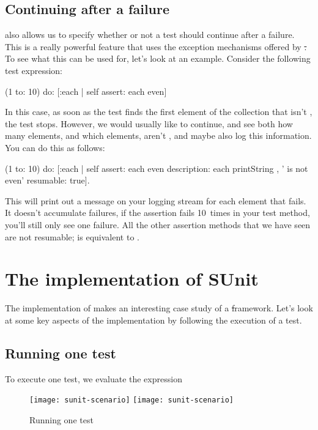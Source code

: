 \documentclass[a4paper,10pt,twoside]{book}
\begin{document}
\subsection{Continuing after a failure}
\sunit also allows us to specify whether or not a test should continue after a failure.
This is a really powerful feature that uses the exception mechanisms offered by \st.
To see what this can be used for, let's look at an example.
Consider the following test expression:
\begin{code}{}
(1 to: 10) do: [:each | self assert: each even]
\end{code}
In this case, as soon as the test finds the first element of the collection that isn't , the test stops.
However, we would usually like to continue, and see both how many elements, and which elements, aren't , and maybe also log this information.
You can do this as follows:
\begin{code}{}
(1 to: 10) do: [:each |
	self
		assert: each even
		description: each printString , ' is not even'
		resumable: true].
\end{code}
This will print out a message on your logging stream for each element that fails.
It doesn't accumulate failures, \ie if the assertion fails 10~times in your test method, you'll still only see one failure.
All the other assertion methods that we have seen are not resumable;  is equivalent to .
\section{The implementation of SUnit}

The implementation of \sunit makes an interesting case study of a \st framework.
Let's look at some key aspects of the implementation by following the execution of a test.
\subsection{Running one test}

To execute one test, we evaluate the expression 


\begin{figure}[tbh]
  \begin{center}
  	\ifluluelse
		{\texttt{[image: sunit-scenario]}}
		{\texttt{[image: sunit-scenario]}}
	\caption{Running one test}
	\label{fig:sunit-scenario}
  \end{center}
\end{figure}
\end{document}
